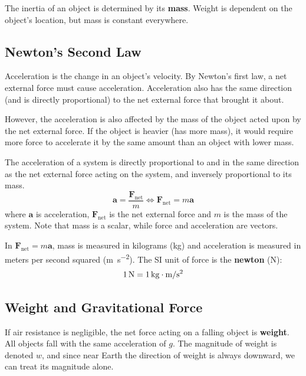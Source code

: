 \documentclass{article}
\newcommand{\theorem}[2]{\begin{tcolorbox}[title={#1},colback=blue!5!white,colframe=blue!75!black,parbox=false] #2 \end{tcolorbox}}
\begin{document}
The inertia of an object is determined by its \textbf{mass}. Weight is dependent on the object's location, but mass is constant everywhere.

\subsection{Newton's Second Law}

Acceleration is the change in an object's velocity. By Newton's first law, a net external force must cause acceleration. Acceleration also has the same direction (and is directly proportional) to the net external force that brought it about.

However, the acceleration is also affected by the mass of the object acted upon by the net external force. If the object is heavier (has more mass), it would require more force to accelerate it by the same amount than an object with lower mass.

\theorem{Newton's second law}{The acceleration of a system is directly proportional to and in the same direction as the net external force acting on the system, and inversely proportional to its mass.
\begin{equation*}
	\mathbf{a}=\frac{\mathbf{F}_{\text{net}}}{m}
	\iff
	\mathbf{F}_{\text{net}}=m \mathbf{a}
\end{equation*}
where $\mathbf{a}$ is acceleration, $\mathbf{F}_{\text{net}}$ is the net external force and $m$ is the mass of the system. Note that mass is a scalar, while force and acceleration are vectors.}

In $\mathbf{F}_{\text{net}}=m \mathbf{a}$, mass is measured in kilograms (kg) and acceleration is measured in meters per second squared (\si{\meter\per\second\squared}). The SI unit of force is the \textbf{newton} (N):
\begin{equation*}
	1\,\si{\newton}=1\,\si[inter-unit-product =\cdot]{\kilo\gram\meter\per\second\squared}
\end{equation*}

\subsection{Weight and Gravitational Force}

If air resistance is negligible, the net force acting on a falling object is \textbf{weight}. All objects fall with the same acceleration of $g$. The magnitude of weight is denoted $w$, and since near Earth the direction of weight is always downward, we can treat its magnitude alone.
\end{document}
